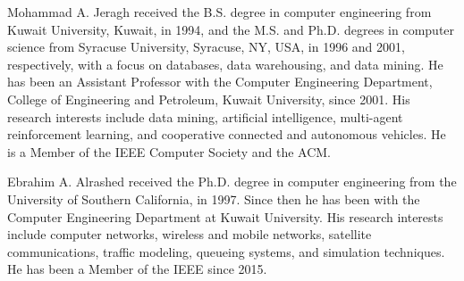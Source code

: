 \documentclass[journal]{IEEEtran}
\begin{document}
\begin{IEEEbiographynophoto}{Mohammad A. Jeragh}
received the B.S. degree in computer engineering from Kuwait University, Kuwait, in 1994, and the M.S. and Ph.D. degrees in computer science from Syracuse University, Syracuse, NY, USA, in 1996 and 2001, respectively, with a focus on databases, data warehousing, and data mining. He has been an Assistant Professor with the Computer Engineering Department, College of Engineering and Petroleum, Kuwait University, since 2001. His research interests include data mining, artificial intelligence, multi-agent reinforcement learning, and cooperative connected and autonomous vehicles. He is a Member of the IEEE Computer Society and the ACM.
\end{IEEEbiographynophoto}

\begin{IEEEbiographynophoto}{Ebrahim A. Alrashed}
received the Ph.D. degree in computer engineering from the University of Southern California, in 1997. Since then he has been with the Computer Engineering Department at Kuwait University. His research interests include computer networks, wireless and mobile networks, satellite communications, traffic modeling, queueing systems, and simulation techniques. He has been a Member of the IEEE since 2015.
\end{IEEEbiographynophoto}
\end{document}
